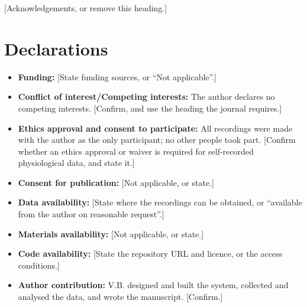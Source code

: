 \documentclass[pdflatex,sn-mathphys-num]{sn-jnl}
\begin{document}
[Acknowledgements, or remove this heading.]

\section*{Declarations}

\begin{itemize}
\item \textbf{Funding:} [State funding sources, or ``Not applicable''.]
\item \textbf{Conflict of interest/Competing interests:} The author declares no competing interests. [Confirm, and use the heading the journal requires.]
\item \textbf{Ethics approval and consent to participate:} All recordings were made with the author as the only participant; no other people took part. [Confirm whether an ethics approval or waiver is required for self-recorded physiological data, and state it.]
\item \textbf{Consent for publication:} [Not applicable, or state.]
\item \textbf{Data availability:} [State where the recordings can be obtained, or ``available from the author on reasonable request''.]
\item \textbf{Materials availability:} [Not applicable, or state.]
\item \textbf{Code availability:} [State the repository URL and licence, or the access conditions.]
\item \textbf{Author contribution:} V.B. designed and built the system, collected and analysed the data, and wrote the manuscript. [Confirm.]
\end{itemize}


\end{document}
